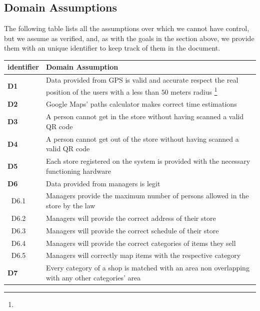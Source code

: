 \FloatBarrier

\subsection{Domain Assumptions}
\label{subsect:domainassumptions}

The following table lists all the assumptions over which we cannot have control, but we assume as verified, and, as with the goals in the section above, we provide them with an unique identifier to keep track of them in the document.

\begin{table}[h!]
    \centering
    \begin{tabular}{@{}P{0.1\textwidth}P{0.80\textwidth}@{}}
        \toprule
        \textbf{identifier}& \textbf{Domain Assumption}\\
        \midrule
        \textbf{D1}        & Data provided from GPS is valid and accurate respect the real position of the users with a less than $50$ meters radius \footnote{}\\
        \textbf{D2}        & Google Maps' paths calculator makes correct time estimations\\
        \textbf{D3}        & A person cannot get in the store without having scanned a valid QR code\\
        \textbf{D4}        & A person cannot get out of the store without having scanned a valid QR code\\
        \textbf{D5}        & Each store registered on the system is provided with the necessary functioning hardware\\
        \textbf{D6}        & Data provided from managers is legit\\
        $\;\;$D6.1         & Managers provide the maximum number of persons allowed in the store by the law\\
        $\;\;$D6.2         & Managers will provide the correct address of their store\\
        $\;\;$D6.3         & Managers will provide the correct schedule of their store\\
        $\;\;$D6.4         & Managers will provide the correct categories of items they sell\\
        $\;\;$D6.5         & Managers will correctly map items with the respective category\\
        \textbf{D7}        & Every category of a shop is matched with an area non overlapping with any other categories' area\\

\end{tabular}
\end{table}
